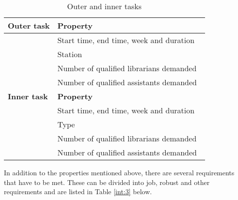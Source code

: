 \begin{table}[!h]
\caption{Outer and inner tasks}
\label{int:2}
\begin{tabular}{|l|l|}
\hline
\textbf{Outer task} & \textbf{Property} \\ \hline
 & Start time, end time, week and duration \
\\ \hline 
 & Station
\\ \hline 
 & Number of qualified librarians demanded
\\ \hline 
 & Number of qualified assistants demanded
\\ \hline 

\textbf{Inner task} & \textbf{Property} \\ \hline
 & Start time, end time, week and duration \
\\ \hline 
 & Type
\\ \hline 
 & Number of qualified librarians demanded
\\ \hline 
 & Number of qualified assistants demanded
\\ \hline 
\end{tabular}
\end{table}

In addition to the properties mentioned above, there are several requirements that have to be met. These can be divided into job, robust and other requirements and are listed in Table \ref{int:3} below. 


